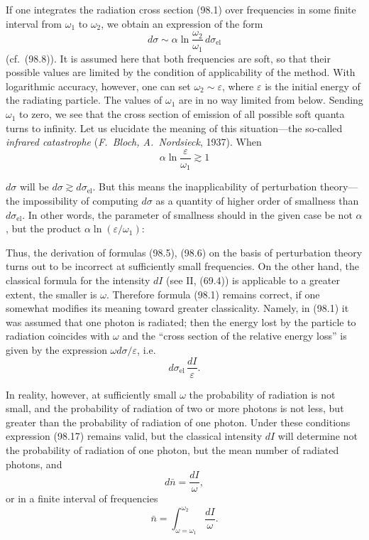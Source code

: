 If one integrates the radiation cross section (98.1) over frequencies in some finite interval from $\omega_1$ to $\omega_2$, we obtain an expression of the form
\begin{equation}
d\sigma \sim \alpha\ln\frac{\omega_2}{\omega_1}\,d\sigma_\text{el}
\label{eq:98.15}
\end{equation}
(cf.\ (98.8)). It is assumed here that both frequencies are soft, so that their possible values are limited by the condition of applicability of the method. With logarithmic accuracy, however, one can set $\omega_2 \sim \varepsilon$, where $\varepsilon$ is the initial energy of the radiating particle. The values of $\omega_1$ are in no way limited from below. Sending $\omega_1$ to zero, we see that the cross section of emission of all possible soft quanta turns to infinity. Let us elucidate the meaning of this situation---the so-called \emph{infrared catastrophe} (\emph{F.~Bloch, A.~Nordsieck}, 1937). When
\begin{equation}
\alpha\ln\frac{\varepsilon}{\omega_1} \gtrsim 1
\label{eq:98.16}
\end{equation}


$d\sigma$ will be $d\sigma \gtrsim d\sigma_\text{el}$. But this means the inapplicability of perturbation theory---the impossibility of computing $d\sigma$ as a quantity of higher order of smallness than $d\sigma_\text{el}$. In other words, the parameter of smallness should in the given case be not $\alpha$, but the product $\alpha\ln(\varepsilon/\omega_1)$:

Thus, the derivation of formulas (98.5), (98.6) on the basis of perturbation theory turns out to be incorrect at sufficiently small frequencies. On the other hand, the classical formula for the intensity $dI$ (see II, (69.4)) is applicable to a greater extent, the smaller is $\omega$. Therefore formula (98.1) remains correct, if one somewhat modifies its meaning toward greater classicality. Namely, in (98.1) it was assumed that one photon is radiated; then the energy lost by the particle to radiation coincides with $\omega$ and the ``cross section of the relative energy loss'' is given by the expression $\omega d\sigma/\varepsilon$, i.e.
\begin{equation}
d\sigma_\text{el}\,\frac{dI}{\varepsilon}.
\label{eq:98.17}
\end{equation}

In reality, however, at sufficiently small $\omega$ the probability of radiation is not small, and the probability of radiation of two or more photons is not less, but greater than the probability of radiation of one photon. Under these conditions expression (98.17) remains valid, but the classical intensity $dI$ will determine not the probability of radiation of one photon, but the mean number of radiated photons, and
\begin{equation}
d\bar{n} = \frac{dI}{\omega},
\label{eq:98.18}
\end{equation}
or in a finite interval of frequencies
\begin{equation}
\bar{n} = \int_{\omega=\omega_1}^{\omega_2}\frac{dI}{\omega}.
\label{eq:98.19}
\end{equation}

